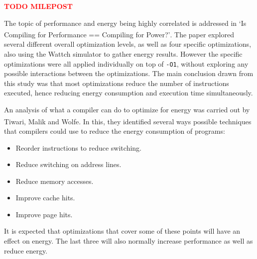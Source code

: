 \documentclass[twocolumn]{article}
\newcommand{\todo}[1]{\textbf{\textcolor{red}{#1}}}
\let\oldcite\cite
\renewcommand{\cite}[1]{\textsuperscript{\oldcite{#1}}}
\begin{document}

\todo{TODO MILEPOST}

The topic of performance and energy being highly correlated is addressed in `Is Compiling for Performance == Compiling for Power?'\cite{CompilingForPerformancePower}. The paper explored several different overall optimization levels, as well as four specific optimizations, also using the Wattch simulator to gather energy results. However the specific optimizations were all applied individually on top of \texttt{-O1}, without exploring any possible interactions between the optimizations. The main conclusion drawn from this study was that most optimizations reduce the number of instructions executed, hence reducing energy consumption and execution time simultaneously.

An analysis of what a compiler can do to optimize for energy was carried out by Tiwari, Malik and Wolfe\cite{CompilationTechniquesForLowEnergy}. In this, they identified several ways possible techniques that compilers could use to reduce the energy consumption of programs:
\begin{itemize}
	\setlength{\itemsep}{0em}
	\vspace{-1mm}

	\item Reorder instructions to reduce switching.
	\item Reduce switching on address lines.
	\item Reduce memory accesses.
	\item Improve cache hits.
	\item Improve page hits.
\end{itemize}

It is expected that optimizations that cover some of these points will have an effect on energy. The last three will also normally increase performance as well as reduce energy.
\end{document}
